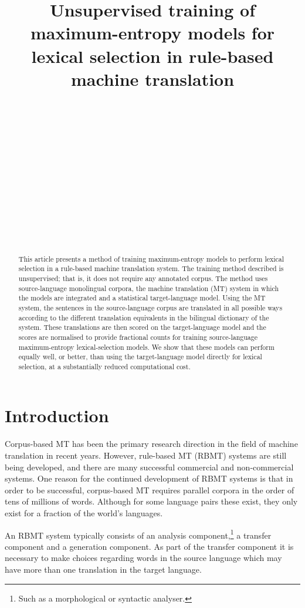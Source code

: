 \documentclass[11pt]{article}
\title{Unsupervised training of maximum-entropy models for lexical
    selection in rule-based machine translation}
\author{
\phantom{Francis M.\ Tyers} \\
\phantom{HSL-fakultehta,} \\
\phantom{UiT Norgga \'{a}rktala\v{s} universitehta,} \\
\phantom{N-9018 Romsa} \\
 \And
\phantom{Felipe S\'anchez-Mart\'inez} \\
\phantom{Dept.\ Lleng.\ i Sist.\ Inform.,} \\
\phantom{Universitat d'Alacant,}\\
\phantom{E-03071 Alacant}\\
 \And
\phantom{Mikel L.\ Forcada} \\
\phantom{Dept.\ Lleng.\ i Sist.\ Inform.,} \\
\phantom{Universitat d'Alacant,}\\
\phantom{E-03071 Alacant}\\
}
\date{}
\begin{document}
\maketitle

\renewcommand{\baselinestretch}{0.97} %

\begin{abstract}
  This article presents a method of training maximum-entropy models to
  perform lexical selection in a rule-based machine translation
  system. The training method described is unsupervised; that is, it
  does not require any annotated corpus. The method uses
  source-language monolingual corpora, the machine translation (MT)
  system in which the models are integrated and a statistical
  target-language model. Using the MT system, the sentences in 
  the source-language corpus are
  translated in all possible ways according to the different
  translation equivalents in the bilingual dictionary of the system.
  These translations are then scored on the target-language model and
  the scores are normalised to provide fractional counts for training
  source-language maximum-entropy lexical-selection models. We show
  that these models can perform equally well, or better, than using
  the target-language model directly for lexical selection, at a
  substantially reduced computational cost.
\end{abstract}


\section{Introduction}

Corpus-based MT has been the primary research direction in the field
of machine translation in recent years. However, rule-based MT (RBMT)
systems are still being developed, and there are many successful
commercial and non-commercial systems. One reason for the continued
development of RBMT systems is that in order to be successful,
corpus-based MT requires parallel corpora in the order of tens of
millions of words. Although for some language pairs these exist, they
only exist for a fraction of the world's languages.

An RBMT system typically consists of an analysis
component,\footnote{Such as a morphological or syntactic analyser.} a
transfer component and a generation component. As part of the transfer
component it is necessary to make choices regarding words in the
source language which may have more than one translation in the target
language.
\end{document}
